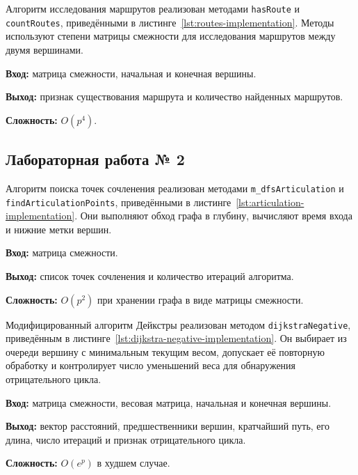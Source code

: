 Алгоритм исследования маршрутов реализован методами \texttt{hasRoute} и \texttt{countRoutes}, приведёнными в листинге~\ref{lst:routes-implementation}. Методы используют степени матрицы смежности для исследования маршрутов между двумя вершинами.

\textbf{Вход:} матрица смежности, начальная и конечная вершины.

\textbf{Выход:} признак существования маршрута и количество найденных маршрутов.

\textbf{Сложность:} $O(p^4)$.


\subsection{Лабораторная работа № 2}

Алгоритм поиска точек сочленения реализован методами \texttt{m\_dfsArticulation} и \texttt{findArticulationPoints}, приведёнными в листинге~\ref{lst:articulation-implementation}. Они выполняют обход графа в глубину, вычисляют время входа и нижние метки вершин.

\textbf{Вход:} матрица смежности.

\textbf{Выход:} список точек сочленения и количество итераций алгоритма.

\textbf{Сложность:} $O(p^2)$ при хранении графа в виде матрицы смежности.


Модифицированный алгоритм Дейкстры реализован методом \texttt{dijkstraNegative}, приведённым в листинге~\ref{lst:dijkstra-negative-implementation}. Он выбирает из очереди вершину с минимальным текущим весом, допускает её повторную обработку и контролирует число уменьшений веса для обнаружения отрицательного цикла.

\textbf{Вход:} матрица смежности, весовая матрица, начальная и конечная вершины.

\textbf{Выход:} вектор расстояний, предшественники вершин, кратчайший путь, его длина, число итераций и признак отрицательного цикла.

\textbf{Сложность:} $O(e^p)$ в худшем случае.


